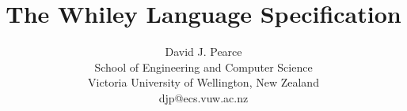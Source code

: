 \documentclass[10pt]{book}
\title{\Huge The Whiley Language Specification}
\author{David J. Pearce\\School of Engineering
  and Computer Science\\Victoria University of Wellington, New
  Zealand\\djp@ecs.vuw.ac.nz}
\begin{document}
\maketitle
\tableofcontents








\printglossaries



\end{document}
